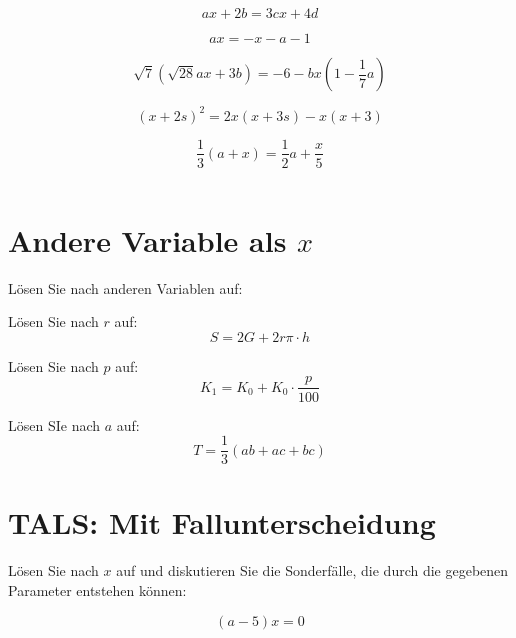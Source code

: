 {\begin{bbwAufgabenBlock}
\item $$ax + 2b = 3cx +4d$$

\item $$ax = -x-a-1$$

\item $$\sqrt{7}\left(\sqrt{28}ax+3b\right) = -6-bx\left(1-\frac17a\right)$$

\item $$(x+2s)^2 = 2x(x+3s)-x(x+3)$$

\item $$\frac13(a+x) = \frac12 a + \frac{x}5$$

\item $$$$
\LoesungsBlock{$\lx=\{\}$}
\end{bbwAufgabenBlock}
\newpage
\section{Andere Variable als $x$}
Lösen Sie nach anderen Variablen auf:

\begin{bbwAufgabenBlock}

\item Lösen Sie nach $r$ auf:
 $$S= 2G + 2r\pi\cdot{}h$$

\item
Lösen Sie nach $p$ auf:
$$K_1 = K_0 + K_0 \cdot{}\frac{p}{100}$$

\item Lösen SIe nach $a$ auf:
$$T = \frac13 (ab + ac + bc)$$

\end{bbwAufgabenBlock}
\newpage
\section{TALS: Mit Fallunterscheidung}
Lösen Sie nach $x$ auf und diskutieren Sie die Sonderfälle, die durch
die gegebenen Parameter entstehen können:
\begin{bbwAufgabenBlock}
\item $$(a-5)x = 0$$


\end{bbwAufgabenBlock}}
